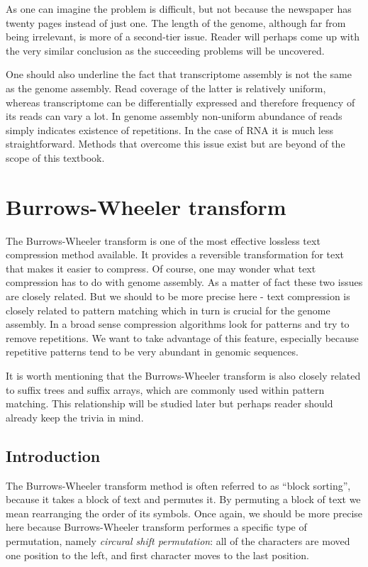 \documentclass[
]{book}
\begin{document}
As one can imagine the problem is difficult, but not because the newspaper has twenty pages instead of just one. The length of the genome, although far from being irrelevant, is more of a second-tier issue. Reader will perhaps come up with the very similar conclusion as the succeeding problems will be uncovered.

One should also underline the fact that transcriptome assembly is not the same as the genome assembly. Read coverage of the latter is relatively uniform, whereas transcriptome can be differentially expressed and therefore frequency of its reads can vary a lot. In genome assembly non-uniform abundance of reads simply indicates existence of repetitions. In the case of RNA it is much less straightforward. Methods that overcome this issue exist but are beyond of the scope of this textbook.

\hypertarget{bwt}{%
\chapter{Burrows-Wheeler transform}\label{bwt}}

The Burrows-Wheeler transform is one of the most effective lossless text compression method available. It provides a reversible transformation for text that makes it easier to compress. Of course, one may wonder what text compression has to do with genome assembly. As a matter of fact these two issues are closely related. But we should to be more precise here - text compression is closely related to pattern matching which in turn is crucial for the genome assembly. In a broad sense compression algorithms look for patterns and try to remove repetitions. We want to take advantage of this feature, especially because repetitive patterns tend to be very abundant in genomic sequences.

It is worth mentioning that the Burrows-Wheeler transform is also closely related to suffix trees and suffix arrays, which are commonly used within pattern matching. This relationship will be studied later but perhaps reader should already keep the trivia in mind. \citep{bw1}

\hypertarget{introduction-1}{%
\section{Introduction}\label{introduction-1}}

The Burrows-Wheeler transform method is often referred to as ``block sorting'', because it takes a block of text and permutes it. By permuting a block of text we mean rearranging the order of its symbols. Once again, we should be more precise here because Burrows-Wheeler transform performes a specific type of permutation, namely \emph{circural shift permutation}: all of the characters are moved one position to the left, and first character moves to the last position.
\end{document}

